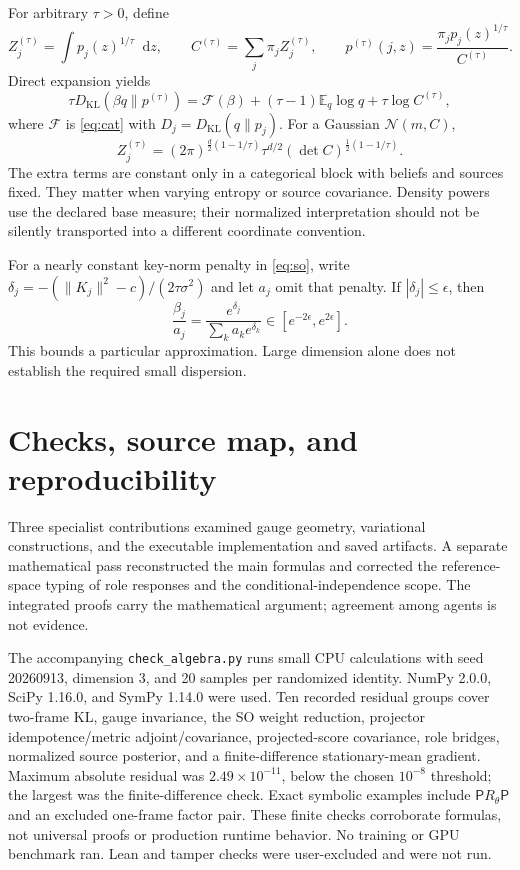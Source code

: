 \documentclass[11pt,letterpaper]{article}
\newcommand{\KL}{D_{\mathrm{KL}}}
\newcommand{\E}{\mathbb E}
\newcommand{\dd}{\mathop{}\mathrm{d}}
\theoremstyle{remark}
\begin{document}
For arbitrary $\tau>0$, define
\begin{equation}
 Z_j^{(\tau)}=\int p_j(z)^{1/\tau}\dd z,\qquad
 C^{(\tau)}=\sum_j\pi_jZ_j^{(\tau)},\qquad
 p^{(\tau)}(j,z)=\frac{\pi_jp_j(z)^{1/\tau}}{C^{(\tau)}}.
\end{equation}
Direct expansion yields
\begin{equation}
 \tau\KL(\beta q\|p^{(\tau)})
 =\mathcal F(\beta)+(\tau-1)\E_q\log q+\tau\log C^{(\tau)},
 \label{eq:power}
\end{equation}
where $\mathcal F$ is \eqref{eq:cat} with $D_j=\KL(q\|p_j)$. For a Gaussian $\mathcal N(m,C)$,
\begin{equation}
 Z_j^{(\tau)}
 =(2\pi)^{\frac d2(1-1/\tau)}
 \tau^{d/2}(\det C)^{\frac12(1-1/\tau)}.
\end{equation}
The extra terms are constant only in a categorical block with beliefs and sources fixed. They matter when varying entropy or source covariance. Density powers use the declared base measure; their normalized interpretation should not be silently transported into a different coordinate convention.

For a nearly constant key-norm penalty in \eqref{eq:so}, write
$\delta_j=-(\|K_j\|^2-c)/(2\tau\sigma^2)$ and let $a_j$ omit that penalty. If $|\delta_j|\le\epsilon$, then
\begin{equation}
 \frac{\beta_j}{a_j}
 =\frac{e^{\delta_j}}{\sum_k a_ke^{\delta_k}}
 \in[e^{-2\epsilon},e^{2\epsilon}].
\end{equation}
This bounds a particular approximation. Large dimension alone does not establish the required small dispersion.

\section{Checks, source map, and reproducibility}
Three specialist contributions examined gauge geometry, variational constructions, and the executable implementation and saved artifacts. A separate mathematical pass reconstructed the main formulas and corrected the reference-space typing of role responses and the conditional-independence scope. The integrated proofs carry the mathematical argument; agreement among agents is not evidence.

The accompanying \texttt{check\_algebra.py} runs small CPU calculations with seed 20260913, dimension 3, and 20 samples per randomized identity. NumPy 2.0.0, SciPy 1.16.0, and SymPy 1.14.0 were used. Ten recorded residual groups cover two-frame KL, gauge invariance, the SO weight reduction, projector idempotence/metric adjoint/covariance, projected-score covariance, role bridges, normalized source posterior, and a finite-difference stationary-mean gradient. Maximum absolute residual was $2.49\times10^{-11}$, below the chosen $10^{-8}$ threshold; the largest was the finite-difference check. Exact symbolic examples include $\mathsf PR_\theta\mathsf P$ and an excluded one-frame factor pair. These finite checks corroborate formulas, not universal proofs or production runtime behavior. No training or GPU benchmark ran. Lean and tamper checks were user-excluded and were not run.
\end{document}
